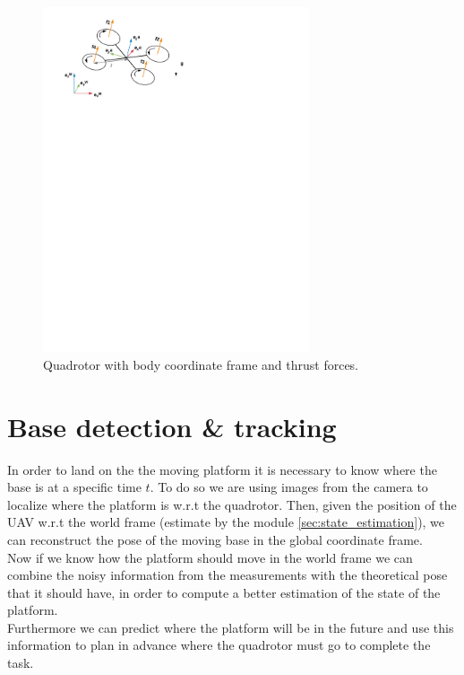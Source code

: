 \begin{figure}[!ht]
    \centering
    \includegraphics[width=0.7\textwidth]{img/quadrotor.pdf}
    \caption{Quadrotor with body coordinate frame and thrust forces.}
    \label{fig:bodyframe}
\end{figure}

\section{Base detection \& tracking}\label{sec:base_estimation}
In order to land on the the moving platform it is necessary to know where the base is at a specific time $t$. To do so we are using images from the camera to localize where the platform is w.r.t the quadrotor. Then, given the position of the UAV w.r.t the world frame (estimate by the module \ref{sec:state_estimation}), we can reconstruct the pose of the moving base in the global coordinate frame. \\
Now if we know how the platform should move in the world frame we can combine the noisy information from the measurements with the theoretical pose  that it should have, in order to compute a better estimation of the state of the platform.  \\
Furthermore we can predict where the platform will be in the future and use this information to plan in advance where the quadrotor must go to complete the task.\\

